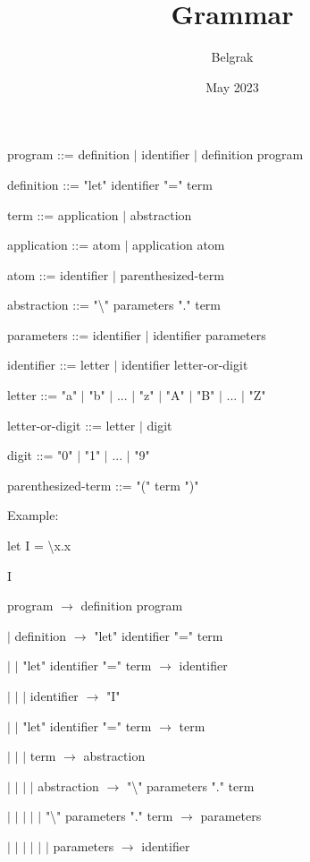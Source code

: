 \documentclass{article}
\title{Grammar}
\author{Belgrak }
\date{May 2023}
\begin{document}
    \maketitle

    program ::= definition $\vert$ identifier $\vert$ definition program

    definition ::= "let" identifier "=" term

    term ::= application $\vert$ abstraction

    application ::= atom $\vert$ application atom

    atom ::= identifier $\vert$ parenthesized-term

    abstraction ::= "\textbackslash" parameters "." term

    parameters ::= identifier $\vert$ identifier parameters

    identifier ::= letter $\vert$ identifier letter-or-digit

    letter ::= "a" $\vert$ "b" $\vert$ ... $\vert$ "z" $\vert$ "A" $\vert$ "B" $\vert$ ... $\vert$ "Z"

    letter-or-digit ::= letter $\vert$ digit

    digit ::= "0" $\vert$ "1" $\vert$ ... $\vert$ "9"

    parenthesized-term ::= "(" term ")"
    \newline

    Example:

    let I = \textbackslash x.x

    I
    \newline

    program $\rightarrow$ definition program

    $\vert$ definition $\rightarrow$ "let" identifier "=" term

    $\vert$ $\vert$ "let" identifier "=" term $\rightarrow$ identifier

    $\vert$ $\vert$ $\vert$ identifier $\rightarrow$ "I"

    $\vert$ $\vert$ "let" identifier "=" term $\rightarrow$ term

    $\vert$ $\vert$ $\vert$ term $\rightarrow$ abstraction

    $\vert$ $\vert$ $\vert$ $\vert$ abstraction $\rightarrow$ "\textbackslash" parameters "." term

    $\vert$ $\vert$ $\vert$ $\vert$ $\vert$ "\textbackslash" parameters "." term $\rightarrow$ parameters

    $\vert$ $\vert$ $\vert$ $\vert$ $\vert$ $\vert$ parameters $\rightarrow$ identifier
\end{document}
